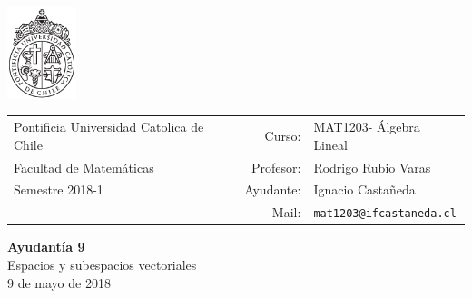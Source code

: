 \documentclass[12pt]{article}
\makeatletter
\newcommand{\ayudantia}{{\sc Ayudantía 9}}
\newcommand{\tituloayu}{Espacios y subespacios vectoriales}
\newcommand{\fecha}{9 de mayo de 2018}
\newcommand{\sigla}{MAT1203}
\newcommand{\nombre}{Álgebra Lineal}
\newcommand{\profesor}{Rodrigo Rubio Varas}
\newcommand{\ano}{2018}
\newcommand{\semestre}{1}
\newcommand{\mail}{mat1203@ifcastaneda.cl}
\makeatother
\begin{document}
\thispagestyle{empty}

\begin{minipage}{2cm}
	\includegraphics[width=2cm]{../../../../img/logo.pdf}
	\vspace{0.5cm}
\end{minipage}
\begin{minipage}{\linewidth}
	\begin{tabular}{lrl}
		{\scriptsize\sc Pontificia Universidad Catolica de Chile} & \hspace*{0.7in}Curso: &
		\sigla  - \nombre\\
		{\sc Facultad de Matemáticas}&
		Profesor: & \profesor \\
		{\sc Semestre \ano-\semestre} & Ayudante: & {Ignacio Castañeda}\\
		& {Mail:} & \texttt{\mail}
	\end{tabular}
\end{minipage}

\vspace{-10mm}
\begin{center}
	{\LARGE\bf \ayudantia}\\
	\vspace{0.1cm}
	{\tituloayu}\\
	\vspace{0.1cm}
	\fecha\\
	\vspace{0.4cm}
\end{center}
\end{document}
